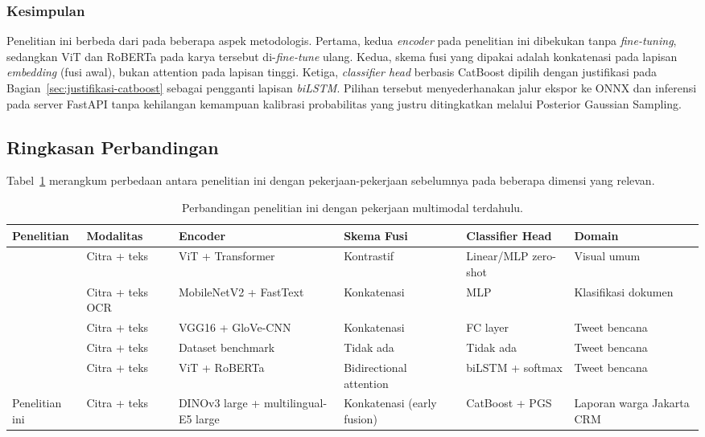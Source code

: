 \subsubsection{Kesimpulan}

Penelitian ini berbeda dari \citet{koshyMultimodalTweet2023} pada beberapa aspek metodologis. Pertama, kedua \textit{encoder} pada penelitian ini dibekukan tanpa \textit{fine-tuning}, sedangkan ViT dan RoBERTa pada karya tersebut di-\textit{fine-tune} ulang. Kedua, skema fusi yang dipakai adalah konkatenasi pada lapisan \textit{embedding} (fusi awal), bukan attention pada lapisan tinggi. Ketiga, \textit{classifier head} berbasis CatBoost dipilih dengan justifikasi pada Bagian~\ref{sec:justifikasi-catboost} sebagai pengganti lapisan \textit{biLSTM}. Pilihan tersebut menyederhanakan jalur ekspor ke ONNX dan inferensi pada server FastAPI tanpa kehilangan kemampuan kalibrasi probabilitas yang justru ditingkatkan melalui Posterior Gaussian Sampling.

\subsection{Ringkasan Perbandingan}

Tabel~\ref{tab:perbandingan-related-work} merangkum perbedaan antara penelitian ini dengan pekerjaan-pekerjaan sebelumnya pada beberapa dimensi yang relevan.

\begin{table}[htbp]
\centering
\caption{Perbandingan penelitian ini dengan pekerjaan multimodal terdahulu.}
\label{tab:perbandingan-related-work}
\small
\setlength{\tabcolsep}{3pt}
\begin{tabular}{p{2.4cm} p{1.6cm} p{2.4cm} p{1.8cm} p{2.0cm} p{2.0cm}}
\toprule
\textbf{Penelitian} & \textbf{Modalitas} & \textbf{Encoder} & \textbf{Skema Fusi} & \textbf{Classifier Head} & \textbf{Domain} \\
\midrule
\citet{radfordCLIP2021} & Citra + teks & ViT + Transformer & Kontrastif & Linear/MLP zero-shot & Visual umum \\
\citet{audebertMultimodalDoc2019} & Citra + teks OCR & MobileNetV2 + FastText & Konkatenasi & MLP & Klasifikasi dokumen \\
\citet{ofliMultimodalDisaster2020} & Citra + teks & VGG16 + GloVe-CNN & Konkatenasi & FC layer & Tweet bencana \\
\citet{alamCrisisMMD2018} & Citra + teks & Dataset benchmark & Tidak ada & Tidak ada & Tweet bencana \\
\citet{koshyMultimodalTweet2023} & Citra + teks & ViT + RoBERTa & Bidirectional attention & biLSTM + softmax & Tweet bencana \\
Penelitian ini & Citra + teks & DINOv3 large + multilingual-E5 large & Konkatenasi (early fusion) & CatBoost + PGS & Laporan warga Jakarta CRM \\
\bottomrule
\end{tabular}
\end{table}

